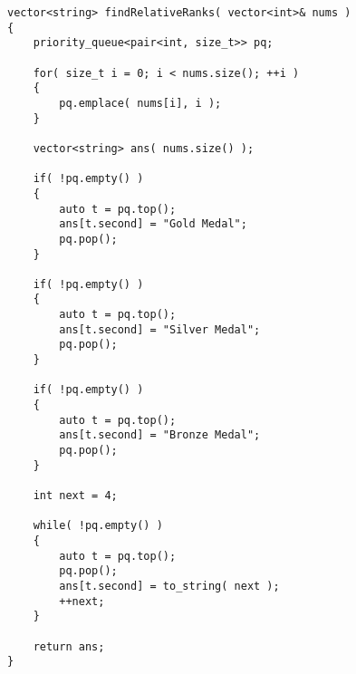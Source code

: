 \setcounter{lstlisting}{0}
\begin{lstlisting}[style=customc, caption={Priority Queue}]
vector<string> findRelativeRanks( vector<int>& nums )
{
    priority_queue<pair<int, size_t>> pq;

    for( size_t i = 0; i < nums.size(); ++i )
    {
        pq.emplace( nums[i], i );
    }

    vector<string> ans( nums.size() );

    if( !pq.empty() )
    {
        auto t = pq.top();
        ans[t.second] = "Gold Medal";
        pq.pop();
    }

    if( !pq.empty() )
    {
        auto t = pq.top();
        ans[t.second] = "Silver Medal";
        pq.pop();
    }

    if( !pq.empty() )
    {
        auto t = pq.top();
        ans[t.second] = "Bronze Medal";
        pq.pop();
    }

    int next = 4;

    while( !pq.empty() )
    {
        auto t = pq.top();
        pq.pop();
        ans[t.second] = to_string( next );
        ++next;
    }

    return ans;
}
\end{lstlisting}